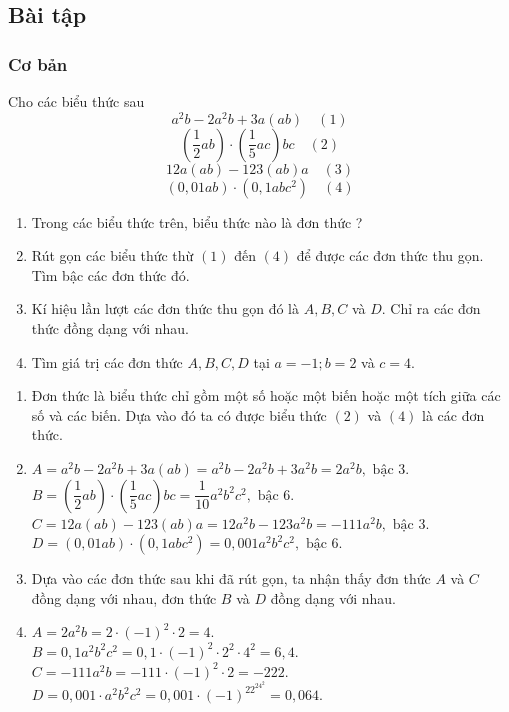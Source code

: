 \subsection{Bài tập}
\subsubsection{Cơ bản}
\begin{bt}%
	Cho các biểu thức sau
	\[ a^2b - 2a^2b + 3a(ab) \quad (1) \]
	\[ \left( \dfrac{1}{2}ab \right) \cdot \left( \dfrac{1}{5} ac\right) bc \quad (2)  \]
	\[ 12a(ab) - 123 (ab)a \quad (3)  \]
	\[ (0,01ab) \cdot (0,1abc^2) \quad (4)  \]
	\begin{enumerate}
		\item Trong các biểu thức trên, biểu thức nào là đơn thức ?
		\item Rút gọn các biểu thức thừ $ (1) $ đến $ (4) $ để được các đơn thức thu gọn. Tìm bậc các đơn thức đó.
		\item Kí hiệu lần lượt các đơn thức thu gọn đó là $ A,B,C $ và $ D $. Chỉ ra các đơn thức đồng dạng với nhau.
		\item Tìm giá trị các đơn thức $ A,B,C,D $ tại $ a=-1; b=2$ và $ c=4$.
	\end{enumerate}
	\loigiai
	{
		\begin{enumerate}
			\item Đơn thức là biểu thức chỉ gồm một số hoặc một biến hoặc một tích giữa các số và các biến. Dựa vào đó ta có được biểu thức $ (2) $ và $ (4) $ là các đơn thức.
			\item $ A=a^2b - 2a^2b + 3a(ab) = a^2b - 2a^2b + 3a^2b=2a^2b, \text{ bậc 3} $.\\
			$B= \left( \dfrac{1}{2}ab \right) \cdot \left( \dfrac{1}{5} ac\right) bc=\dfrac{1}{10}a^2b^2c^2 , \text{ bậc 6}$.\\
			$ C= 12a(ab) - 123 (ab)a = 12a^2b-123a^2b=-111a^2b, \text{ bậc 3}$.\\
			$ D= (0,01ab) \cdot (0,1abc^2)=0,001a^2b^2c^2, \text{ bậc 6}  $.
			\item Dựa vào các đơn thức sau khi đã rút gọn, ta nhận thấy đơn thức $ A $ và $ C $ đồng dạng với nhau, đơn thức $ B $ và $ D $ đồng dạng với nhau.
			\item $ A = 2a^2b=2\cdot (-1)^2\cdot 2=4 $.\\
			$ B=0,1a^2b^2c^2=0,1\cdot (-1)^2\cdot 2^2 \cdot 4^2=6,4 $.\\
			$ C=-111a^2b = -111\cdot (-1)^2\cdot 2 = -222 $.\\
			$ D=0,001\cdot a^2b^2c^2=0,001\cdot (-1)^22^24^2=0,064 $.
		\end{enumerate}
	}
\end{bt}


